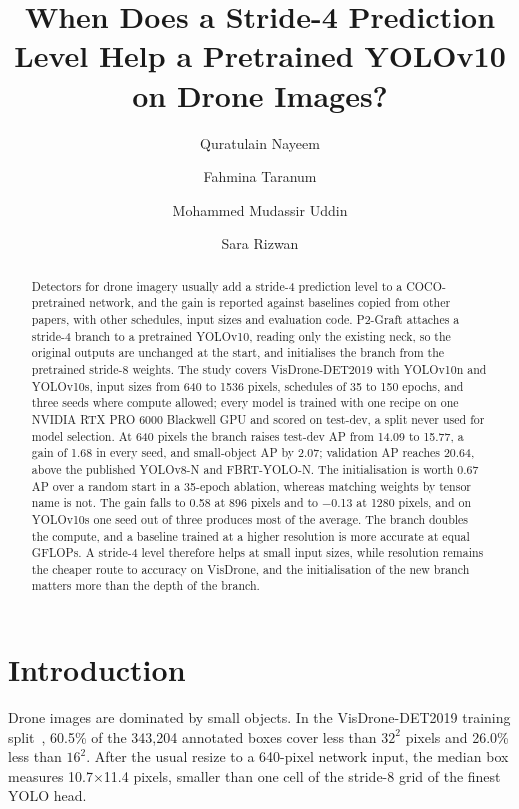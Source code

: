 \documentclass[runningheads]{llncs}
\begin{document}
\title{When Does a Stride-4 Prediction Level Help a Pretrained YOLOv10 on Drone Images?}
\author{Quratulain Nayeem \and Fahmina Taranum \and Mohammed Mudassir Uddin \and Sara Rizwan}
\maketitle

\begin{abstract}
Detectors for drone imagery usually add a stride-4 prediction level to a COCO-pretrained network, and the gain is reported against baselines copied from other papers, with other schedules, input sizes and evaluation code. P2-Graft attaches a stride-4 branch to a pretrained YOLOv10, reading only the existing neck, so the original outputs are unchanged at the start, and initialises the branch from the pretrained stride-8 weights. The study covers VisDrone-DET2019 with YOLOv10n and YOLOv10s, input sizes from 640 to 1536 pixels, schedules of 35 to 150 epochs, and three seeds where compute allowed; every model is trained with one recipe on one NVIDIA RTX PRO 6000 Blackwell GPU and scored on test-dev, a split never used for model selection. At 640 pixels the branch raises test-dev AP from 14.09 to 15.77, a gain of 1.68 in every seed, and small-object AP by 2.07; validation AP reaches 20.64, above the published YOLOv8-N and FBRT-YOLO-N. The initialisation is worth 0.67 AP over a random start in a 35-epoch ablation, whereas matching weights by tensor name is not. The gain falls to 0.58 at 896 pixels and to $-$0.13 at 1280 pixels, and on YOLOv10s one seed out of three produces most of the average. The branch doubles the compute, and a baseline trained at a higher resolution is more accurate at equal GFLOPs. A stride-4 level therefore helps at small input sizes, while resolution remains the cheaper route to accuracy on VisDrone, and the initialisation of the new branch matters more than the depth of the branch.
\end{abstract}

\section{Introduction}
Drone images are dominated by small objects. In the VisDrone-DET2019 training split~\cite{du2019visdrone}, 60.5\% of the 343,204 annotated boxes cover less than $32^2$ pixels and 26.0\% less than $16^2$. After the usual resize to a 640-pixel network input, the median box measures 10.7$\times$11.4 pixels, smaller than one cell of the stride-8 grid of the finest YOLO head.
\end{document}
